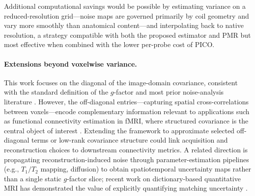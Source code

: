 \documentclass[AMA,STIX2COL,Linenumberson]{MRM}
\begin{document}
Additional computational savings would be possible by estimating
variance on a reduced-resolution grid---noise maps are
governed primarily by coil geometry and vary more smoothly
than anatomical content---and interpolating back to native
resolution, a strategy compatible with both the proposed
estimator and PMR but most effective when combined with the
lower per-probe cost of PICO.
%

\paragraph{Extensions beyond voxelwise variance.}
This work focuses on the diagonal of the image-domain 
covariance, consistent with the standard definition of the 
$g$-factor and most prior noise-analysis literature 
\cite{sense,pmr,grappa_noise,akcakaya2014,dalmaz2025efficient}. 
However, the off-diagonal entries---capturing spatial 
cross-correlations between voxels---encode complementary 
information relevant to applications such as functional 
connectivity estimation in fMRI, where structured covariance 
is the central object of interest 
\cite{varoquaux2010covsel,behrouz2024bridgefc}. Extending the 
framework to approximate selected off-diagonal terms or 
low-rank covariance structure could link acquisition and 
reconstruction choices to downstream connectivity metrics. 
A related direction is propagating reconstruction-induced 
noise through parameter-estimation pipelines (e.g., $T_1/T_2$ 
mapping, diffusion) to obtain spatiotemporal uncertainty maps 
rather than a single static $g$-factor slice; recent work on 
dictionary-based quantitative MRI has demonstrated the value 
of explicitly quantifying matching uncertainty 
\cite{toner2026uqdict}.

\end{document}
